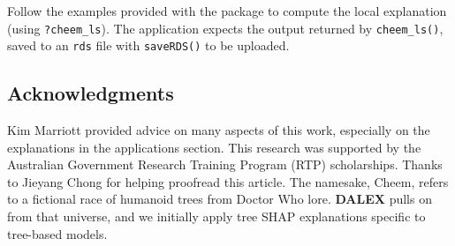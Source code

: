 \documentclass[
]{jss}
\begin{document}
Follow the examples provided with the package to compute the local
explanation (using \texttt{?cheem\_ls}). The application expects the
output returned by \texttt{cheem\_ls()}, saved to an \texttt{rds} file
with \texttt{saveRDS()} to be uploaded.

\hypertarget{acknowledgments}{%
\subsection*{Acknowledgments}\label{acknowledgments}}

Kim Marriott provided advice on many aspects of this work, especially on
the explanations in the applications section. This research was
supported by the Australian Government Research Training Program (RTP)
scholarships. Thanks to Jieyang Chong for helping proofread this
article. The namesake, Cheem, refers to a fictional race of humanoid
trees from Doctor Who lore. \textbf{DALEX} pulls on from that universe,
and we initially apply tree SHAP explanations specific to tree-based
models.

\renewcommand\refname{References}

\end{document}
